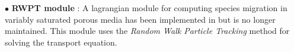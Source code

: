 \begin{list}{-}{}
%
\vspace{5pt}
%
\item[$\bullet$] \textbf{RWPT module} :
A lagrangian module for computing species migration
in variably saturated porous media has been implemented in \estel but is no longer maintained.
This module uses the \textit{Random Walk Particle Tracking} method for solving the transport equation.


\end{list}
